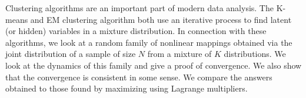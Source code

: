 Clustering algorithms are an important part of modern data analysis.  The K-means and EM clustering algorithm both use an iterative process to find latent (or hidden) variables in a mixture distribution.  In connection with these algorithms, we look at a random family of nonlinear mappings obtained via the joint distribution of a sample of size $N$ from a mixture of $K$ distributions.  We look at the dynamics of this family and give a proof of convergence.  We also show that the convergence is consistent in some sense.  We compare the answers obtained to those found by maximizing using Lagrange multipliers.